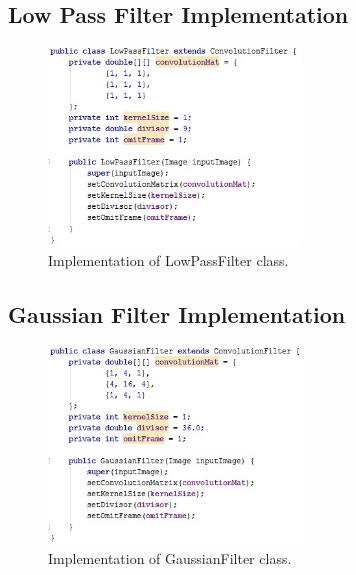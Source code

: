 \documentclass{article}
\begin{document}
%
% 
\subsection{Low Pass Filter Implementation} \label{low_pass_impl}
\begin{figure}[H]
	\centering
	\includegraphics[width=0.6\textwidth]{_Figures/code/lowpass.jpg}
    \caption{Implementation of LowPassFilter class.}
    \label{fig:code:lowpass}
\end{figure}

\newpage
%
%
\subsection{Gaussian Filter Implementation} \label{gaussian_impl}
\begin{figure}[H]
	\centering
	\includegraphics[width=0.6\textwidth]{_Figures/code/gaussian.jpg}
    \caption{Implementation of GaussianFilter class.}
    \label{fig:code:gaussian}
\end{figure}

%
%
\end{document}
